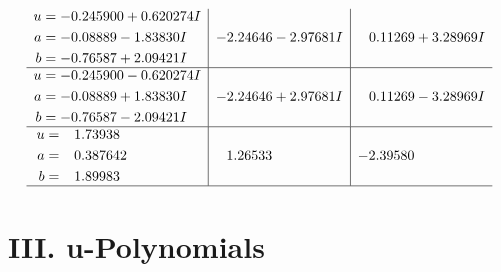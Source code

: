 \documentclass[1p]{elsarticle_modified}
\theoremstyle{definition}
\begin{document}
$$\begin{array}{c|c|c}
\begin{aligned}
u &= -0.245900 + 0.620274 I \\
a &= -0.08889 - 1.83830 I \\
b &= -0.76587 + 2.09421 I\end{aligned}
 & -2.24646 - 2.97681 I & \phantom{-}0.11269 + 3.28969 I \\ \hline\begin{aligned}
u &= -0.245900 - 0.620274 I \\
a &= -0.08889 + 1.83830 I \\
b &= -0.76587 - 2.09421 I\end{aligned}
 & -2.24646 + 2.97681 I & \phantom{-}0.11269 - 3.28969 I \\ \hline\begin{aligned}
u &= \phantom{-}1.73938\phantom{ +0.000000I} \\
a &= \phantom{-}0.387642\phantom{ +0.000000I} \\
b &= \phantom{-}1.89983\phantom{ +0.000000I}\end{aligned}
 & \phantom{-}1.26533\phantom{ +0.000000I} & -2.39580\phantom{ +0.000000I}\\
 \hline 
 \end{array}$$\newpage
\newpage\renewcommand{\arraystretch}{1}
\centering \section*{ III. u-Polynomials}
\end{document}
